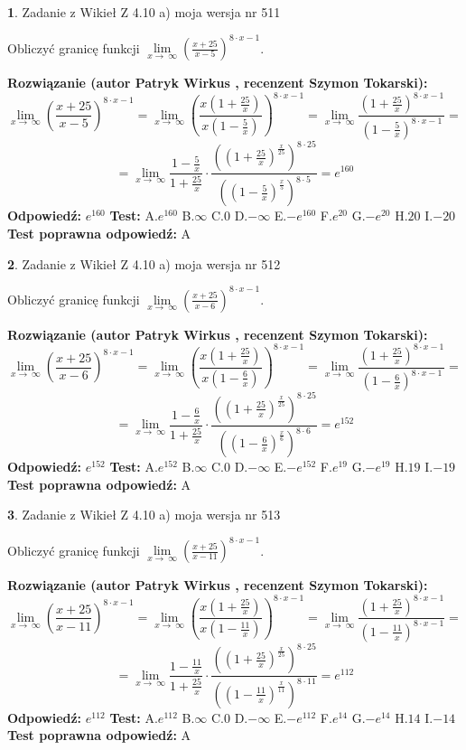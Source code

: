\documentclass[12pt, a4paper]{article}
\theoremstyle{definition} %
\newtheorem{zad}{}
\newcommand{\zadStart}[1]{\begin{zad}#1\newline}
\newcommand{\zadStop}{\end{zad}}
\newcommand{\rozwStart}[2]{\noindent \textbf{Rozwiązanie (autor #1 , recenzent #2): }\newline}
\newcommand{\rozwStop}{\newline}
\newcommand{\odpStart}{\noindent \textbf{Odpowiedź:}\newline}
\newcommand{\odpStop}{\newline}
\newcommand{\testStart}{\noindent \textbf{Test:}\newline}
\newcommand{\testStop}{\newline}
\newcommand{\kluczStart}{\noindent \textbf{Test poprawna odpowiedź:}\newline}
\newcommand{\kluczStop}{\newline}
\begin{document}
\zadStart{Zadanie z Wikieł Z 4.10 a) moja wersja nr 511}

Obliczyć granicę funkcji  $\lim\limits_{x\to\ \infty}(\frac{x+25}{x-5})^{8\cdot x-1}$.
\zadStop
\rozwStart{Patryk Wirkus}{Szymon Tokarski}
$$\lim\limits_{x\to\ \infty}(\frac{x+25}{x-5})^{8\cdot x-1} = \lim\limits_{x\to\ \infty}(\frac{x(1+\frac{25}{x})}{x(1-\frac{5}{x})})^{8\cdot x-1}=\lim\limits_{x\to\ \infty}\frac{(1+\frac{25}{x})^{8\cdot x-1}}{(1-\frac{5}{x})^{8\cdot x-1}}=$$
$$=\lim\limits_{x\to\ \infty}\frac{1-\frac{5}{x}}{1+\frac{25}{x}}\cdot\frac{((1+\frac{25}{x})^{\frac{x}{25}})^{8\cdot25}}{((1-\frac{5}{x})^{\frac{x}{5}})^{8\cdot5}}=e^{160}$$
\rozwStop
\odpStart
$e^{160}$
\odpStop
\testStart
A.$e^{160}$ B.$\infty$ C.$0$ D.$-\infty$ E.$-e^{160}$
F.$e^{20}$ G.$-e^{20}$
H.$20$
I.$-20$
\testStop
\kluczStart
A
\kluczStop



\zadStart{Zadanie z Wikieł Z 4.10 a) moja wersja nr 512}

Obliczyć granicę funkcji  $\lim\limits_{x\to\ \infty}(\frac{x+25}{x-6})^{8\cdot x-1}$.
\zadStop
\rozwStart{Patryk Wirkus}{Szymon Tokarski}
$$\lim\limits_{x\to\ \infty}(\frac{x+25}{x-6})^{8\cdot x-1} = \lim\limits_{x\to\ \infty}(\frac{x(1+\frac{25}{x})}{x(1-\frac{6}{x})})^{8\cdot x-1}=\lim\limits_{x\to\ \infty}\frac{(1+\frac{25}{x})^{8\cdot x-1}}{(1-\frac{6}{x})^{8\cdot x-1}}=$$
$$=\lim\limits_{x\to\ \infty}\frac{1-\frac{6}{x}}{1+\frac{25}{x}}\cdot\frac{((1+\frac{25}{x})^{\frac{x}{25}})^{8\cdot25}}{((1-\frac{6}{x})^{\frac{x}{6}})^{8\cdot6}}=e^{152}$$
\rozwStop
\odpStart
$e^{152}$
\odpStop
\testStart
A.$e^{152}$ B.$\infty$ C.$0$ D.$-\infty$ E.$-e^{152}$
F.$e^{19}$ G.$-e^{19}$
H.$19$
I.$-19$
\testStop
\kluczStart
A
\kluczStop



\zadStart{Zadanie z Wikieł Z 4.10 a) moja wersja nr 513}

Obliczyć granicę funkcji  $\lim\limits_{x\to\ \infty}(\frac{x+25}{x-11})^{8\cdot x-1}$.
\zadStop
\rozwStart{Patryk Wirkus}{Szymon Tokarski}
$$\lim\limits_{x\to\ \infty}(\frac{x+25}{x-11})^{8\cdot x-1} = \lim\limits_{x\to\ \infty}(\frac{x(1+\frac{25}{x})}{x(1-\frac{11}{x})})^{8\cdot x-1}=\lim\limits_{x\to\ \infty}\frac{(1+\frac{25}{x})^{8\cdot x-1}}{(1-\frac{11}{x})^{8\cdot x-1}}=$$
$$=\lim\limits_{x\to\ \infty}\frac{1-\frac{11}{x}}{1+\frac{25}{x}}\cdot\frac{((1+\frac{25}{x})^{\frac{x}{25}})^{8\cdot25}}{((1-\frac{11}{x})^{\frac{x}{11}})^{8\cdot11}}=e^{112}$$
\rozwStop
\odpStart
$e^{112}$
\odpStop
\testStart
A.$e^{112}$ B.$\infty$ C.$0$ D.$-\infty$ E.$-e^{112}$
F.$e^{14}$ G.$-e^{14}$
H.$14$
I.$-14$
\testStop
\kluczStart
A
\kluczStop
\end{document}
